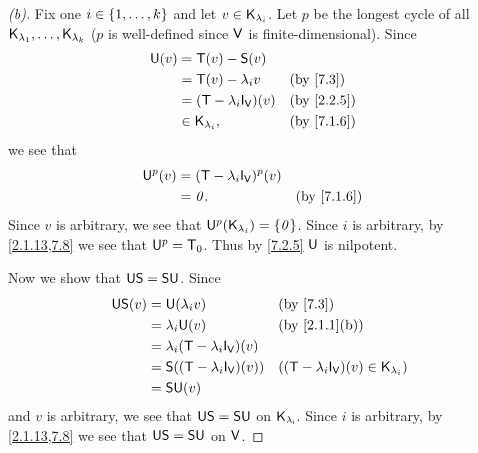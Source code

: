 \begin{proof}[(b)]
  Fix one \(i \in \left\lbrace1, \dots, k\right\rbrace\) and let \(v \in \mathsf{K}_{\lambda_i}\).
  Let \(p\) be the longest cycle of all \(\mathsf{K}_{\lambda_1}, \dots, \mathsf{K}_{\lambda_k}\)
  (\(p\) is well-defined since \(\mathsf{V}\) is finite-dimensional).
  Since
  \begin{align*}
    \U(v) & = \T(v) - \lt{S}(v)                           \\
          & = \T(v) - \lambda_i v         &  & \by{7.3}   \\
          & = (\T - \lambda_i \IT[\V])(v) &  & \by{2.2.5} \\
          & \in \vs{K}_{\lambda_i},       &  & \by{7.1.6}
  \end{align*}
  we see that
  \begin{align*}
    \U^p(v) & = (\T - \lambda_i \IT[\V])^p(v)                 \\
            & = \zv.                          &  & \by{7.1.6}
  \end{align*}
  Since \(v\) is arbitrary, we see that \(\mathsf{U}^p(\mathsf{K}_{\lambda_i}) = \left\lbrace\mathit{0}\right\rbrace\).
  Since \(i\) is arbitrary, by \cref{2.1.13,7.8} we see that \(\mathsf{U}^p = \mathsf{T}_0\).
  Thus by \cref{7.2.5} \(\mathsf{U}\) is nilpotent.

  Now we show that \(\mathsf{U} \mathsf{S} = \mathsf{S} \mathsf{U}\).
  Since
  \begin{align*}
    \U \lt{S}(v) & = \U(\lambda_i v)                       &  & \by{7.3}                                             \\
                 & = \lambda_i \U(v)                       &  & \by{2.1.1}[b]                                        \\
                 & = \lambda_i (\T - \lambda_i \IT[\V])(v)                                                           \\
                 & = \lt{S}((\T - \lambda_i \IT[\V])(v))   &  & ((\T - \lambda_i \IT[\V])(v) \in \vs{K}_{\lambda_i}) \\
                 & = \lt{S} \U(v)
  \end{align*}
  and \(v\) is arbitrary, we see that \(\mathsf{U} \mathsf{S} = \mathsf{S} \mathsf{U}\) on \(\mathsf{K_{\lambda_i}}\).
  Since \(i\) is arbitrary, by \cref{2.1.13,7.8} we see that \(\mathsf{U} \mathsf{S} = \mathsf{S} \mathsf{U}\) on \(\mathsf{V}\).
\end{proof}

